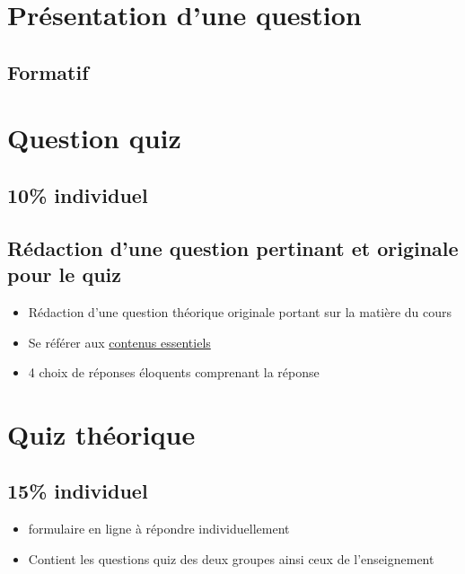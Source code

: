 \documentclass[
]{book}
\providecommand{\tightlist}{%
  \setlength{\itemsep}{0pt}\setlength{\parskip}{0pt}}
\begin{document}
\hypertarget{formatif_2}{%
\section{Présentation d'une question}\label{formatif_2}}

\hypertarget{formatif-1}{%
\subsection{Formatif}\label{formatif-1}}

\hypertarget{sommatif_2}{%
\section{Question quiz}\label{sommatif_2}}

\hypertarget{individuel}{%
\subsection{10\% individuel}\label{individuel}}

\hypertarget{ruxe9daction-dune-question-pertinant-et-originale-pour-le-quiz}{%
\subsection{Rédaction d'une question pertinant et originale pour le quiz}\label{ruxe9daction-dune-question-pertinant-et-originale-pour-le-quiz}}

\begin{itemize}
\tightlist
\item
  Rédaction d'une question théorique originale portant sur la matière du cours
\item
  Se référer aux \protect\hyperlink{contenus_essentiels}{contenus essentiels}
\item
  4 choix de réponses éloquents comprenant la réponse
\end{itemize}

\hypertarget{sommatif_3}{%
\section{Quiz théorique}\label{sommatif_3}}

\hypertarget{individuel-1}{%
\subsection{15\% individuel}\label{individuel-1}}

\begin{itemize}
\tightlist
\item
  formulaire en ligne à répondre individuellement
\item
  Contient les questions quiz des deux groupes ainsi ceux de l'enseignement
\end{itemize}
\end{document}
